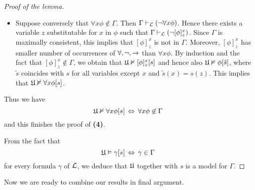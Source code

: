 \begin{proof}[Proof of the lemma]
\begin{enumerate}[label=\textbf{(\arabic*)}, leftmargin=3.0em]
\begin{itemize}
$$\fU \nvDash \phi[\tilde{s}]$$
we deduce that
$$\fU \nvDash \alpha(\phi)[\tilde{s}]$$
and hence
$$\fU \nvDash [\alpha(\phi)]^x_t[s]$$
Since according to Lemma \ref{lemma:alphabetic_variants} numbers of symbols $\forall , \neg, \ra$ occurring in $\alpha(\phi)$ and $\phi$ are the same, we deduce that $[\alpha(\phi)]^x_t$ has smaller number of occurrances of $\forall , \neg, \ra$ than $\gamma$. Thus by induction and the fact that $\fU \nvDash [\alpha(\phi)]^x_t[s]$, we derive that $[\alpha(\phi)]^x_t$ is not contained in $\Gamma$. If $\forall x \phi$ is contained in $\Gamma$, then by Lemma \ref{lemma:deduction_implies_quantified_deduction} it follows that $\Gamma \vdash_{\cL} \forall x\alpha(\phi)$ and then since $(\forall x\alpha(\phi) \ra [\alpha(\phi)]^x_t)$ is an axiom of $\vdash_{\cL}$, we obtain that $\Gamma \vdash_{\cL} [\alpha(\phi)]^x_t$. Since $\Gamma$ is maximally consistent, this would mean that $[\alpha(\phi)]^x_t \in \Gamma$. This is a contradiction. We deduce $\Gamma \nvdash \forall x\phi$ and hence $\forall x\phi \not \in \Gamma$.
\item Suppose conversely that $\forall x\phi \not \in  \Gamma$. Then $\Gamma \vdash_{{\mathcal L}} (\neg\forall x\phi)$. Hence there exists a variable $z$ substitutable for $x$ in $\phi$ such that $\Gamma \vdash_{{\mathcal L}} (\neg[\phi]^x_z)$. Since $\Gamma$ is maximally consistent, this implies that $[\phi]^x_z$ is not in $\Gamma$. Moreover, $[\phi]^x_z$ has smaller number of occurrences of $\forall , \neg, \ra$ than $\forall x\phi$. By induction and the fact that $[\phi]^x_z \not \in  \Gamma$, we obtain that ${\mathfrak U} \nvDash [\phi]^x_z[s]$ and hence also ${\mathfrak U} \nvDash \phi[\tilde{s}]$, where $\tilde{s}$ coincides with $s$ for all variables except $x$ and $\tilde{s}(x) =
s(z)$. This implies that ${\mathfrak U} \nvDash \forall x\phi[s]$.
\end{itemize}
Thus we have
$${\mathfrak U} \nvDash \forall x\phi[s] \,\Leftrightarrow\, \forall x\phi \not \in \Gamma$$
and this finishes the proof of \textbf{(4)}.
\end{enumerate}
From the fact that
$${\mathfrak U} \vDash \gamma[s] \,\Leftrightarrow\, \gamma \in \Gamma$$
for every formula $\gamma$ of ${\mathcal L}$, we deduce that ${\mathfrak U}$ together with $s$ is a model for $\Gamma$.
\end{proof}
\noindent
Now we are ready to combine our results in final argument.

